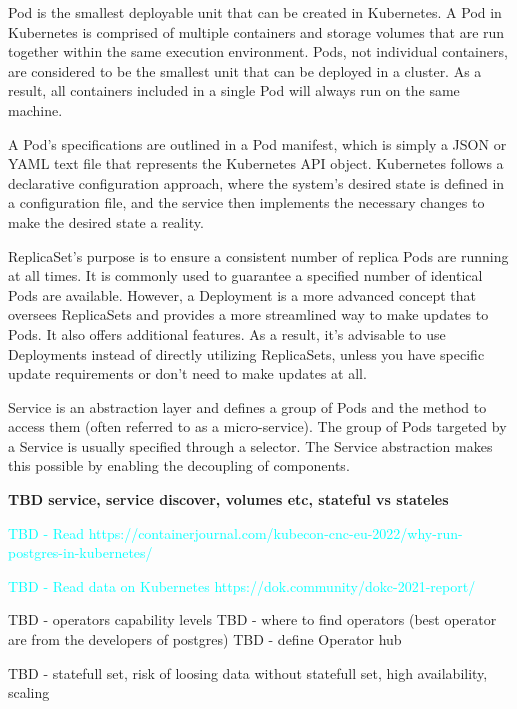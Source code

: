 Pod is the smallest deployable unit that can be created in Kubernetes. \cite{docuKubePods} A Pod in Kubernetes is comprised of multiple containers and storage volumes that are run together within the same execution environment. Pods, not individual containers, are considered to be the smallest unit that can be deployed in a cluster. As a result, all containers included in a single Pod will always run on the same machine. \cite{kubeUpAndRunningPods}

A Pod's specifications are outlined in a Pod manifest, which is simply a JSON or YAML text file that represents the Kubernetes API object. Kubernetes follows a declarative configuration approach, where the system's desired state is defined in a configuration file, and the service then implements the necessary changes to make the desired state a reality. \cite{docuKubeStaticPod}

ReplicaSet’s purpose is to ensure a consistent number of replica Pods are running at all times. It is commonly used to guarantee a specified number of identical Pods are available. However, a Deployment is a more advanced concept that oversees ReplicaSets and provides a more streamlined way to make updates to Pods. It also offers additional features. As a result, it's advisable to use Deployments instead of directly utilizing ReplicaSets, unless you have specific update requirements or don't need to make updates at all. \cite{docuKubeReplicaset}

Service is an abstraction layer and defines a group of Pods and the method to access them (often referred to as a micro-service). The group of Pods targeted by a Service is usually specified through a selector. The Service abstraction makes this possible by enabling the decoupling of components. \cite{docuKubeSevice}

\textbf{TBD service, service discover, volumes etc, stateful vs stateles}

\textcolor{cyan}{TBD - Read https://containerjournal.com/kubecon-cnc-eu-2022/why-run-postgres-in-kubernetes/}

\textcolor{cyan}{TBD - Read data on Kubernetes https://dok.community/dokc-2021-report/}



TBD - operators capability levels
TBD - where to find operators (best operator are from the developers of postgres)
TBD - define Operator hub

TBD - statefull set, risk of loosing data without statefull set, high availability, scaling


